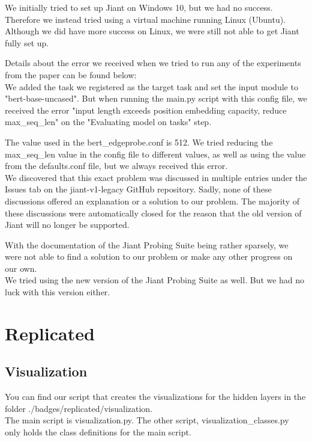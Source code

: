 \documentclass{article}
\begin{document}
	We initially tried to set up Jiant on Windows 10, but we had no success. Therefore we instead tried using a virtual machine running Linux (Ubuntu). Although we did have more success on Linux, we were still not able to get Jiant fully set up.
	
	Details about the error we received when we tried to run any of the experiments from the paper can be found below:\\
	
	We added the task we registered as the target task and set the input module to "bert-base-uncased". But when running the main.py script with this config file, we received the error "input length exceeds position embedding capacity, reduce max\_seq\_len" on the "Evaluating model on tasks" step. 
	
	The value used in the bert\_edgeprobe.conf is 512. We tried reducing the max\_seq\_len value in the config file to different values, as well as using the value from the defaults.conf file, but we always received this error.\\
	
	We discovered that this exact problem was discussed in multiple entries under the Issues tab on the jiant-v1-legacy GitHub repository. Sadly, none of these discussions offered an explanation or a solution to our problem. The majority of these discussions were automatically closed for the reason that the old version of Jiant will no longer be supported.
	
	With the documentation of the Jiant Probing Suite being rather sparsely, we were not able to find a solution to our problem or make any other progress on our own.\\
	
	We tried using the new version of the Jiant Probing Suite as well. But we had no luck with this version either.
	
	\section{Replicated}
	\subsection{Visualization}
	You can find our script that creates the visualizations for the hidden layers in the folder ./badges/replicated/visualization.\\
	
	The main script is visualization.py. The other script, visualization\_classes.py only holds the class definitions for the main script.
	
\end{document}
